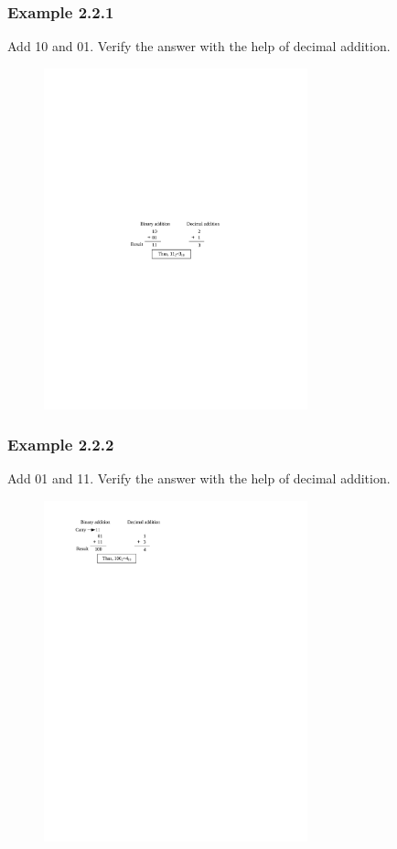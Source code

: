 \documentclass{beamer}
\begin{document}
\frame
{\frametitle {Example 2.2.1}
Add 10 and 01. Verify the answer with the help of decimal addition. 
\begin{figure}[!ht]
\centering
\includegraphics[width=3in]{221}
\end{figure}
}

\frame
{\frametitle {Example 2.2.2}
Add 01 and 11. Verify the answer with the help of decimal addition.
\begin{figure}[!ht]
\centering
\includegraphics[width=3in]{222}
\end{figure}
}
\end{document}
